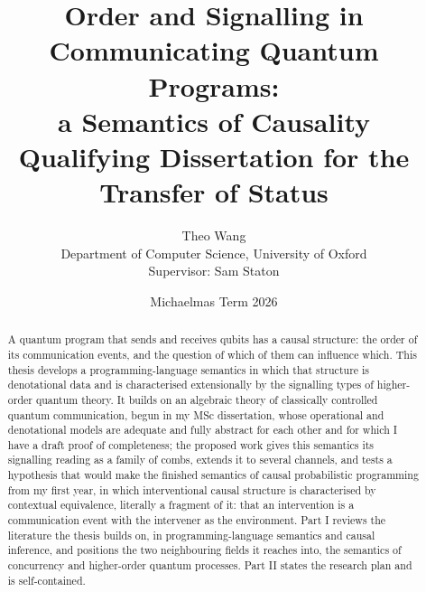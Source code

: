 
\title{Order and Signalling in Communicating Quantum Programs:\\ a Semantics of Causality\\[1ex]
\large Qualifying Dissertation for the Transfer of Status}
\author{Theo Wang\\ \small Department of Computer Science, University of Oxford\\ \small Supervisor: Sam Staton}
\date{Michaelmas Term 2026}


\maketitle

\begin{abstract}
\noindent
A quantum program that sends and receives qubits has a causal structure: the order of its communication events, and the question of which of them can influence which. This thesis develops a programming-language semantics in which that structure is denotational data and is characterised extensionally by the signalling types of higher-order quantum theory. It builds on an algebraic theory of classically controlled quantum communication, begun in my MSc dissertation, whose operational and denotational models are adequate and fully abstract for each other and for which I have a draft proof of completeness; the proposed work gives this semantics its signalling reading as a family of combs, extends it to several channels, and tests a hypothesis that would make the finished semantics of causal probabilistic programming from my first year, in which interventional causal structure is characterised by contextual equivalence, literally a fragment of it: that an intervention is a communication event with the intervener as the environment. Part I reviews the literature the thesis builds on, in programming-language semantics and causal inference, and positions the two neighbouring fields it reaches into, the semantics of concurrency and higher-order quantum processes. Part II states the research plan and is self-contained.
\end{abstract}

\tableofcontents



\printbibliography


